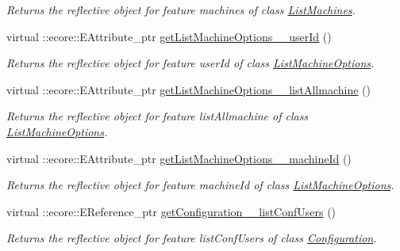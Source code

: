 \begin{DoxyCompactItemize}
\begin{DoxyCompactList}\small\item\em Returns the reflective object for feature machines of class \hyperlink{classUMS__Data_1_1ListMachines}{ListMachines}. \item\end{DoxyCompactList}\item 
virtual ::ecore::EAttribute\_\-ptr \hyperlink{classUMS__Data_1_1UMS__DataPackage_a8eb054cf98ebc54aed8f2c1da1dd10b6}{getListMachineOptions\_\-\_\-userId} ()
\begin{DoxyCompactList}\small\item\em Returns the reflective object for feature userId of class \hyperlink{classUMS__Data_1_1ListMachineOptions}{ListMachineOptions}. \item\end{DoxyCompactList}\item 
virtual ::ecore::EAttribute\_\-ptr \hyperlink{classUMS__Data_1_1UMS__DataPackage_a423fc92e818d7cf75e5579500ad61bf8}{getListMachineOptions\_\-\_\-listAllmachine} ()
\begin{DoxyCompactList}\small\item\em Returns the reflective object for feature listAllmachine of class \hyperlink{classUMS__Data_1_1ListMachineOptions}{ListMachineOptions}. \item\end{DoxyCompactList}\item 
virtual ::ecore::EAttribute\_\-ptr \hyperlink{classUMS__Data_1_1UMS__DataPackage_a9987ec74a15bdc230bcc92a4ca469896}{getListMachineOptions\_\-\_\-machineId} ()
\begin{DoxyCompactList}\small\item\em Returns the reflective object for feature machineId of class \hyperlink{classUMS__Data_1_1ListMachineOptions}{ListMachineOptions}. \item\end{DoxyCompactList}\item 
virtual ::ecore::EReference\_\-ptr \hyperlink{classUMS__Data_1_1UMS__DataPackage_ab49b88f958463e3a7b87bdedcb35c54a}{getConfiguration\_\-\_\-listConfUsers} ()
\begin{DoxyCompactList}\small\item\em Returns the reflective object for feature listConfUsers of class \hyperlink{classUMS__Data_1_1Configuration}{Configuration}. \item\end{DoxyCompactList}\item 

\end{DoxyCompactItemize}
